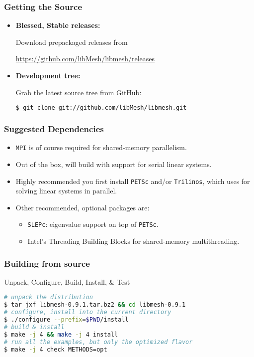\begin{frame}[fragile]
  \frametitle{Getting the \libMesh{} Source}

  \begin{block}{}
    \begin{itemize}
    \item \textbf{Blessed, Stable releases:}

      Download prepackaged releases from

      \scriptsize{\url{https://github.com/libMesh/libmesh/releases}}
      \normalsize
    \item \textbf{Development tree:}

      Grab the latest source tree from GitHub:
      \begin{lstlisting}[language=bash]
$ git clone git://github.com/libMesh/libmesh.git
      \end{lstlisting}
    \end{itemize}
  \end{block}
\end{frame}

\begin{frame}
  \frametitle{\libMesh{} Suggested Dependencies}
  \begin{itemize}
    \item  \texttt{MPI} is of course required for shared-memory parallelism.
    \item Out of the box, \libMesh{} will build with support for serial linear systems.
    \item Highly recommended you first install \texttt{PETSc} and/or \texttt{Trilinos}, which \libMesh{} uses for solving linear systems in parallel.
      \item Other recommended, optional packages are:
        \begin{itemize}
          \item \texttt{SLEPc}: eigenvalue support on top of \texttt{PETSc}.
          \item Intel's Threading Building Blocks for shared-memory multithreading.
        \end{itemize}
  \end{itemize}
\end{frame}

\begin{frame}[fragile]
  \frametitle{Building \libMesh{} from source}

  \begin{block}{Unpack, Configure, Build, Install, \& Test}
    \begin{lstlisting}[language=bash]
# unpack the distribution
$ tar jxf libmesh-0.9.1.tar.bz2 && cd libmesh-0.9.1
# configure, install into the current directory
$ ./configure --prefix=$PWD/install
# build & install
$ make -j 4 && make -j 4 install
# run all the examples, but only the optimized flavor
$ make -j 4 check METHODS=opt
    \end{lstlisting}
  \end{block}
\end{frame}



